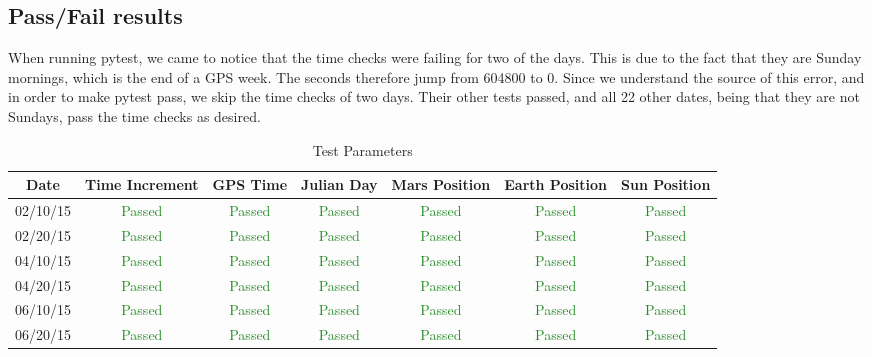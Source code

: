 \subsection{Pass/Fail results}

When running pytest, we came to notice that the time checks were failing for two of the days. This is due to the fact that they are Sunday mornings, which is the end of a GPS week. The seconds therefore jump from 604800 to 0. Since we understand the source of this error, and in order to make pytest pass, we skip the time checks of two days. Their other tests passed, and all 22 other dates, being that they are not Sundays, pass the time checks as desired. 

\begin{table}[htbp]
	\caption{Test Parameters}
	\label{tab:parameters}
	\centering \fontsize{10}{10}\selectfont
	\begin{tabular}{c | c | c | c | c | c | c} %
		\hline
		Date   & Time Increment &GPS Time& Julian Day & Mars Position & Earth Position & Sun Position \\
		\hline
		02/10/15 & \textcolor{ForestGreen}{Passed} & \textcolor{ForestGreen}{Passed} &  \textcolor{ForestGreen}{Passed}&  \textcolor{ForestGreen}{Passed} & \textcolor{ForestGreen}{Passed} &  \textcolor{ForestGreen}{Passed}\\
		02/20/15 & \textcolor{ForestGreen}{Passed} & \textcolor{ForestGreen}{Passed} &  \textcolor{ForestGreen}{Passed}&  \textcolor{ForestGreen}{Passed} & \textcolor{ForestGreen}{Passed} &  \textcolor{ForestGreen}{Passed}\\
		04/10/15 & \textcolor{ForestGreen}{Passed} & \textcolor{ForestGreen}{Passed} &  \textcolor{ForestGreen}{Passed}&  \textcolor{ForestGreen}{Passed} & \textcolor{ForestGreen}{Passed} &  \textcolor{ForestGreen}{Passed}\\
		04/20/15 & \textcolor{ForestGreen}{Passed} & \textcolor{ForestGreen}{Passed} &  \textcolor{ForestGreen}{Passed}&  \textcolor{ForestGreen}{Passed} & \textcolor{ForestGreen}{Passed} &  \textcolor{ForestGreen}{Passed}\\
		06/10/15 & \textcolor{ForestGreen}{Passed} & \textcolor{ForestGreen}{Passed} &  \textcolor{ForestGreen}{Passed}&  \textcolor{ForestGreen}{Passed} & \textcolor{ForestGreen}{Passed} &  \textcolor{ForestGreen}{Passed}\\
		06/20/15 & \textcolor{ForestGreen}{Passed} & \textcolor{ForestGreen}{Passed} &  \textcolor{ForestGreen}{Passed}&  \textcolor{ForestGreen}{Passed} & \textcolor{ForestGreen}{Passed} &  \textcolor{ForestGreen}{Passed}\\

\end{tabular}
\end{table}
